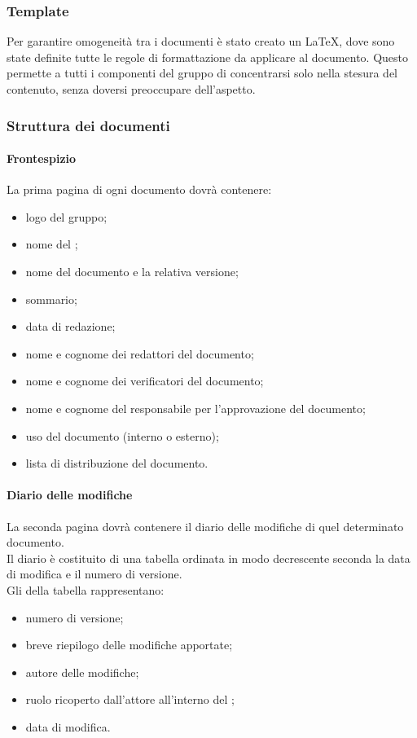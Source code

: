 \subsubsection{Template}
Per garantire omogeneità tra i documenti è stato creato un  \LaTeX, dove sono state definite tutte le regole di formattazione da applicare al documento. Questo permette a tutti i componenti del gruppo di concentrarsi solo nella stesura del contenuto, senza doversi preoccupare dell'aspetto. 
\subsubsection{Struttura dei documenti}
 \paragraph{Frontespizio} 
La prima pagina di ogni documento dovrà contenere:
\begin{itemize}
	\item logo del gruppo;
	\item nome del ;
	\item nome del documento e la relativa versione;
	\item sommario;
	\item data di redazione;
	\item nome e cognome dei redattori del documento;
	\item nome e cognome dei verificatori del documento;
	\item nome e cognome del responsabile per l'approvazione del documento;
	\item uso del documento (interno o esterno);
	\item lista di distribuzione del documento.
\end{itemize}
 \paragraph{Diario delle modifiche}
 La seconda pagina dovrà contenere il diario delle modifiche di quel determinato documento.\\
 Il diario è costituito di una tabella ordinata in modo decrescente seconda la data di modifica e il numero di versione.\\
 Gli  della tabella rappresentano:
 \begin{itemize}
 	\item numero di versione;
 	\item breve riepilogo delle modifiche apportate;
 	\item autore delle modifiche;
 	\item ruolo ricoperto dall'attore all'interno del ;
 	\item data di modifica.
 \end{itemize}
